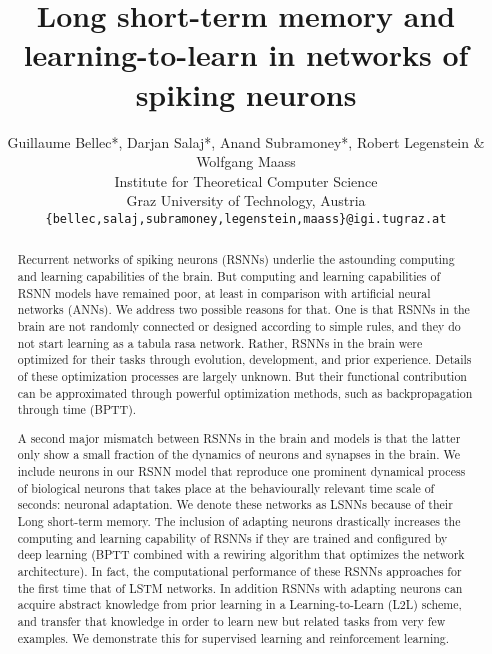 \documentclass{article} \pdfoutput=1
\title{Long short-term memory and learning-to-learn in networks of spiking neurons}
\author{Guillaume Bellec*, Darjan Salaj*, Anand Subramoney*, Robert Legenstein \& Wolfgang Maass \\
Institute for Theoretical Computer Science\\
Graz University of Technology, Austria \\
\texttt{\{bellec,salaj,subramoney,legenstein,maass\}@igi.tugraz.at} \\
\text{* equal contributions}
}
\begin{document}
\maketitle

\begin{abstract}










Recurrent networks of spiking neurons (RSNNs) underlie the astounding computing and learning capabilities of the brain. But computing and learning capabilities of RSNN models have remained poor, at least in comparison with artificial neural networks (ANNs). We address two possible reasons for that. One is that RSNNs in the brain are not randomly connected or designed according to simple rules, and they do not start learning as a tabula rasa network. Rather, RSNNs in the brain were optimized for their tasks through evolution, development, and prior experience. Details of these optimization processes are largely unknown. But their functional contribution can be approximated through powerful optimization methods, such as backpropagation through time (BPTT).

A second major mismatch between RSNNs in the brain and models is that the latter only show a small fraction of the dynamics of neurons and synapses in the brain. We include neurons in our RSNN model that reproduce one prominent dynamical process of biological neurons that takes place at the behaviourally relevant time scale of seconds: neuronal adaptation. We denote these networks as LSNNs because of their Long short-term memory. The inclusion of adapting neurons drastically increases the computing and learning capability of RSNNs if they are trained and configured by deep learning (BPTT combined with a rewiring algorithm that optimizes the network architecture). In fact, the computational performance of these RSNNs approaches for the first time that of LSTM networks. In addition RSNNs with adapting neurons can acquire abstract knowledge from prior learning in a Learning-to-Learn (L2L) scheme, and transfer that knowledge in order to learn new but related tasks from very few examples. We demonstrate this for supervised learning and reinforcement learning.

\end{abstract}
\end{document}
